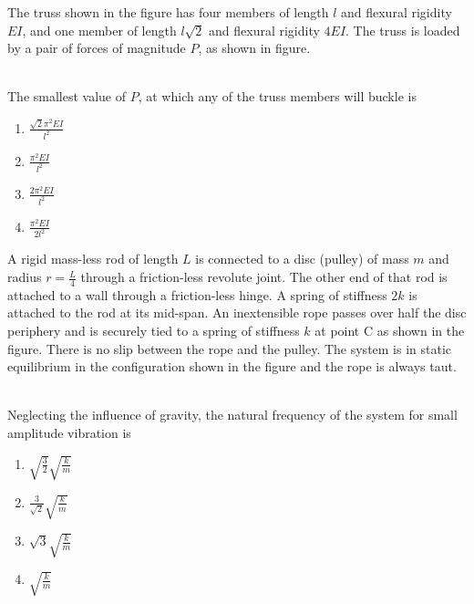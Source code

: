 \iffalse
\chapter{2020}
\author{AI24BTECH11009}
\section{me}
\fi

\item The truss shown in the figure has four members of length $l$ and flexural rigidity $EI$, and one member of length $l\sqrt{2}$ and flexural rigidity $4EI$. The truss is loaded by a pair of forces of magnitude $P$, as shown in figure.
\begin{figure}[!ht]
\centering
\resizebox{0.5\textwidth}{!}{%

}%
\end{figure}\\
The smallest value of $P$, at which any of the truss members will buckle is
\begin{enumerate}
    \item $\frac{\sqrt{2}\pi^2EI}{l^2}$
    \item $\frac{\pi^2EI}{l^2}$
    \item $\frac{2\pi^2EI}{l^2}$
    \item $\frac{\pi^2EI}{2l^2}$ \\
\end{enumerate}
\item A rigid mass-less rod of length $L$ is connected to a disc (pulley) of mass $m$ and radius $r = \frac{L}{4}$ through a friction-less revolute joint. The other end of that rod is attached to a wall through a friction-less hinge. A spring of stiffness $2k$ is attached to the rod at its mid-span. An inextensible rope passes over half the disc periphery and is securely tied to a spring of stiffness $k$ at point C as shown in the figure. There is no slip
between the rope and the pulley. The system is in static equilibrium in the configuration shown in the figure and the rope is always taut.
\begin{figure}[!ht]
\centering
\resizebox{0.5\textwidth}{!}{%

}%
\end{figure}\\
Neglecting the influence of gravity, the natural frequency of the system for small amplitude vibration is 
\begin{enumerate}
    \item $\sqrt{\frac{3}{2}}\sqrt{\frac{k}{m}}$
    \item $\frac{3}{\sqrt{2}}\sqrt{\frac{k}{m}}$
    \item $\sqrt{3}\sqrt{\frac{k}{m}}$
    \item $\sqrt{\frac{k}{m}}$ \\
\end{enumerate}
